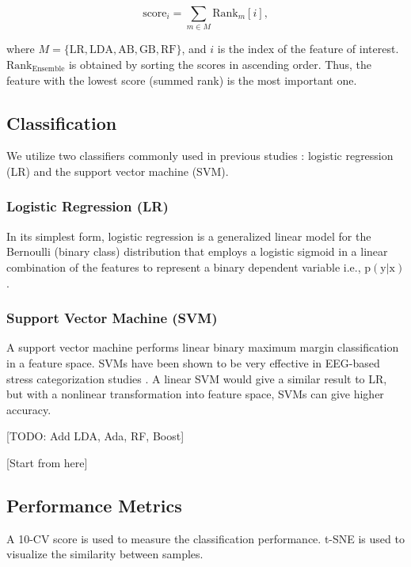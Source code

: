 \documentclass[pdflatex,sn-mathphys]{sn-jnl}%
\theoremstyle{thmstyleone}%
\theoremstyle{thmstyletwo}%
\theoremstyle{thmstylethree}%
\begin{document}
\begin{equation} \label{eq:rank_score}
   \text{score}_i = \sum_{m\in M} \text{Rank}_{m}[i],
\end{equation}

where $M = \{\text{LR}, \text{LDA}, \text{AB}, \text{GB}, \text{RF} \}$, and $i$ is the index of the feature of interest. $\text{Rank}_{\text{Ensemble}}$ is obtained by sorting the scores in ascending order. Thus, the feature with the lowest score (summed rank) is the most important one.

\subsection{Classification}\label{subsec4}
We utilize two classifiers commonly used in previous studies \cite{Alshargie-2018, Subhani-2017, Saeed2020, Kotsiantis2007}: logistic regression (LR) and the support vector machine (SVM).

\subsubsection{Logistic Regression (LR)}
In its simplest form, logistic regression is a generalized linear model for the Bernoulli (binary class) distribution that employs a logistic sigmoid in a linear combination of the features to represent a binary dependent variable i.e., $ \text{p} ( \text{y} \vert \text{x} ) $.

\subsubsection{Support Vector Machine (SVM)}
A support vector machine performs linear binary maximum margin classification in a feature space. SVMs have been shown to be very effective in EEG-based stress categorization studies \cite{Alshargie-2018, Subhani-2017}. A linear SVM would give a similar result to LR, but with a nonlinear transformation into feature space, SVMs can give higher accuracy.

[TODO: Add LDA, Ada, RF, Boost]

[Start from here]

\subsection{Performance Metrics}\label{subsec5}
A 10-CV score is used to measure the classification performance. t-SNE is used to visualize the similarity between samples. 
\end{document}
